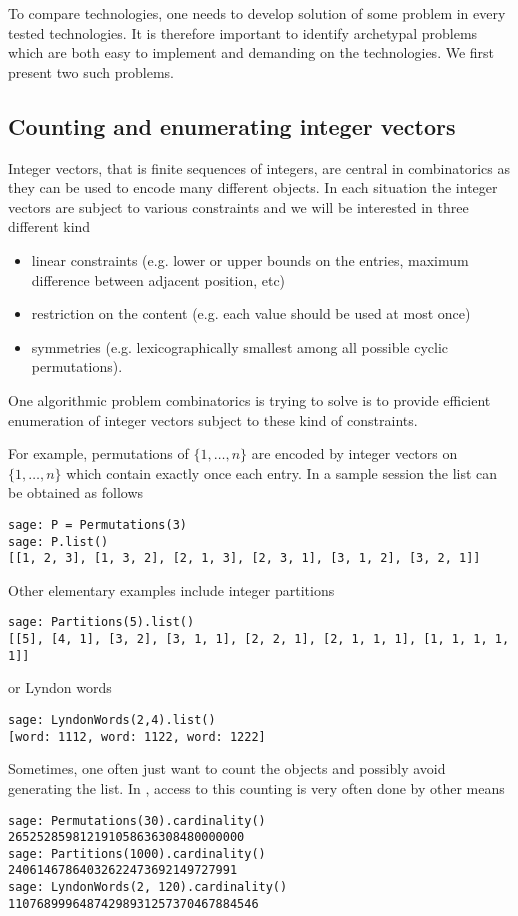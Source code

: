 \documentclass{deliverablereport}
\begin{document}
To compare technologies, one needs to develop solution of some problem in
every tested technologies. It is therefore important to identify archetypal
problems which are both easy to implement and demanding on the technologies.
We first present two such problems.

\subsection{Counting and enumerating integer vectors}
\label{subsec:intro:integer:vectors}

Integer vectors, that is finite sequences of integers, are central
in combinatorics as they can be used to encode many different
objects. In each situation the integer vectors are subject to various
constraints and we will be interested in three different kind
\begin{itemize}
\item linear constraints (e.g. lower or upper bounds on the entries,
maximum difference between adjacent position, etc)
\item restriction on the content (e.g. each value should be used
at most once)
\item symmetries (e.g. lexicographically smallest among all possible
cyclic permutations).
\end{itemize}
One algorithmic problem combinatorics is trying to solve is to provide
efficient enumeration of integer vectors subject to these kind of
constraints.

For example, permutations of $\{1, \ldots, n\}$ are encoded by integer vectors
on $\{1, \ldots, n\}$ which contain exactly once each entry. In a sample
\Sage session the list can be obtained as follows
\begin{verbatim}
sage: P = Permutations(3)
sage: P.list()
[[1, 2, 3], [1, 3, 2], [2, 1, 3], [2, 3, 1], [3, 1, 2], [3, 2, 1]]
\end{verbatim}
Other elementary examples include integer partitions
\begin{verbatim}
sage: Partitions(5).list()
[[5], [4, 1], [3, 2], [3, 1, 1], [2, 2, 1], [2, 1, 1, 1], [1, 1, 1, 1, 1]]
\end{verbatim}
or Lyndon words
\begin{verbatim}
sage: LyndonWords(2,4).list()
[word: 1112, word: 1122, word: 1222]
\end{verbatim}

Sometimes, one often just want to count the objects and possibly avoid
generating the list. In \Sage, access to this counting is very often
done by other means
\begin{verbatim}
sage: Permutations(30).cardinality()
265252859812191058636308480000000
sage: Partitions(1000).cardinality()
24061467864032622473692149727991
sage: LyndonWords(2, 120).cardinality()
11076899964874298931257370467884546
\end{verbatim}
\end{document}
